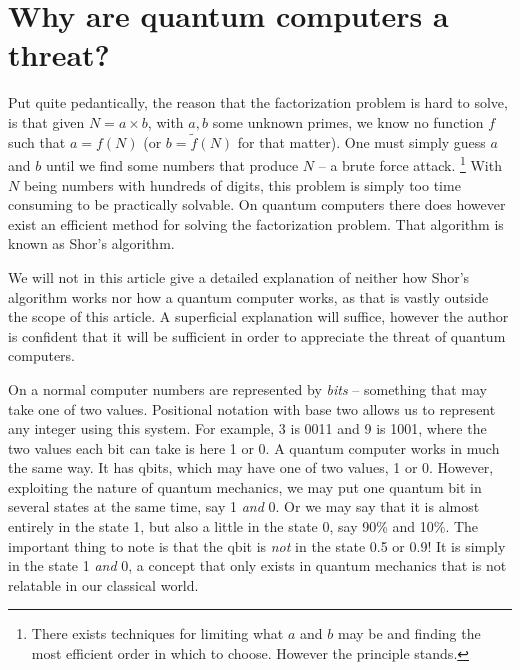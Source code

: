 \documentclass[conference]{IEEEtran}
\begin{document}
\section{Why are quantum computers a threat?}
Put quite pedantically, the reason that the factorization problem is hard to solve, is that given $N = a \times b$, with $a,b$ some unknown primes, we know no function $f$ such that $a = f(N)$ (or $b=\tilde{f}(N)$ for that matter).
One must simply guess $a$ and $b$ until we find some numbers that produce $N$ -- a brute force attack. \footnote{There exists techniques for limiting what $a$ and $b$ may be and finding the most efficient order in which to choose. However the principle stands.}
With $N$ being numbers with hundreds of digits, this problem is simply too time consuming to be practically solvable.
On quantum computers there does however exist an efficient method for solving the factorization problem.
That algorithm is known as Shor's algorithm.

We will not in this article give a detailed explanation of neither how Shor's algorithm works nor how a quantum computer works, as that is vastly outside the scope of this article.
A superficial explanation will suffice, however the author is confident that it will be sufficient in order to appreciate the threat of quantum computers.

On a normal computer numbers are represented by \emph{bits} -- something that may take one of two values.
Positional notation with base two allows us to represent any integer using this system.
For example, 3 is 0011 and 9 is 1001, where the two values each bit can take is here 1 or 0.
A quantum computer works in much the same way.
It has qbits, which may have one of two values, 1 or 0.
However, exploiting the nature of quantum mechanics, we may put one quantum bit in several states at the same time, say 1 \emph{and} 0.
Or we may say that it is almost entirely in the state 1, but also a little in the state 0, say 90\% and 10\%.
The important thing to note is that the qbit is \emph{not} in the state 0.5 or 0.9!
It is simply in the state 1 \emph{and} 0, a concept that only exists in quantum mechanics that is not relatable in our classical world.
\end{document}
